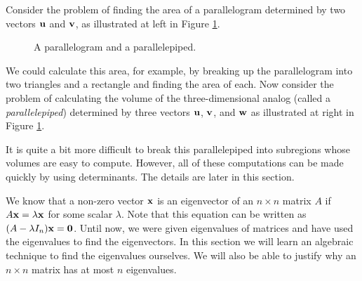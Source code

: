  \label{chap:determinants}

\vspace*{-17 pt}

\vspace*{13 pt}

\label{sec:appl_area_vol}
Consider the problem of finding the area of a parallelogram determined by two  vectors $\mathbf{u}$ and $\mathbf{v}$, as illustrated at left in Figure \ref{F:det_area}.
\begin{figure}[ht]
  \begin{center}
 \hspace{0.1in} 
    \caption{A parallelogram and a parallelepiped.}
    \label{F:det_area}
  \end{center}
\end{figure}
We could calculate this area, for example, by breaking up the parallelogram into two triangles and a rectangle and finding the area of each. Now consider the problem of calculating the volume of the three-dimensional analog (called a \emph{parallelepiped}) determined by three vectors $\mathbf{u}$, $\mathbf{v}$, and $\mathbf{w}$ as illustrated at right in Figure \ref{F:det_area}. 

It is quite a bit more difficult to break this parallelepiped into subregions whose volumes are easy to compute. However, all of these computations can be made quickly by using determinants. The details are later in this section. 

\label{sec:det_intro}
We know that a non-zero vector $\mathbf{x}$ is an eigenvector of an $n \times n$ matrix $A$ if $A \mathbf{x} = \lambda \mathbf{x}$ for some scalar $\lambda$. Note that this equation can be written as $(A-\lambda I_n)\mathbf{x}=\mathbf{0}$. Until now, we were given eigenvalues of matrices and have used the eigenvalues to find the eigenvectors. In this section we will learn an algebraic technique to find the eigenvalues ourselves. We will also be able to justify why an $n\times n$ matrix has at most $n$ eigenvalues. 

